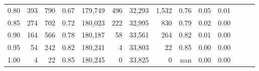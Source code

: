 \begin{tabular}{rrrrrrrrrrrrrr}
0.80 &     393 &    790 &  0.67 &  179,749 &      496 &  32,293 &   1,532 &  0.76 &  0.05 &      0.01 \\
0.85 &     274 &    702 &  0.72 &  180,023 &      222 &  32,995 &     830 &  0.79 &  0.02 &      0.00 \\
0.90 &     164 &    566 &  0.78 &  180,187 &       58 &  33,561 &     264 &  0.82 &  0.01 &      0.00 \\
0.95 &      54 &    242 &  0.82 &  180,241 &        4 &  33,803 &      22 &  0.85 &  0.00 &      0.00 \\
1.00 &       4 &     22 &  0.85 &  180,245 &        0 &  33,825 &       0 &   nan &  0.00 &      0.00 \\
\bottomrule
\end{tabular}
